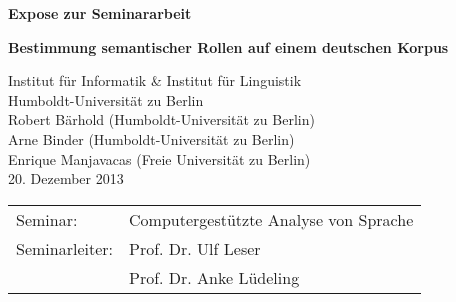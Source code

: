 \documentclass[12pt]{article}
\begin{document}
\thispagestyle{empty} 

\begin{center}
	\vspace*{\fill}
	
	\Huge{\textbf{Expose zur Seminararbeit}}\\
	\vspace{1.5cm}
	
	\Large{\textbf{Bestimmung semantischer Rollen auf einem deutschen Korpus}}\\	
	\vspace{1.5cm}
		

	\begin{Large}
		Institut für Informatik \& Institut für Linguistik\\
		Humboldt-Universität zu Berlin\\
		\vspace{1.5cm}
		Robert Bärhold (Humboldt-Universität zu Berlin)\\
		Arne Binder (Humboldt-Universität zu Berlin)\\
		Enrique Manjavacas (Freie Universität zu Berlin)\\
		20. Dezember 2013 \\
		\vspace{1.5cm}
		
		\begin{table}[h]
			\Large
			\centering
			\begin{tabular}{l l}
				Seminar: & Computergestützte Analyse von Sprache\\
				Seminarleiter: & Prof. Dr. Ulf Leser\\
				 		    & Prof. Dr. Anke Lüdeling
			\end{tabular}
		\end{table}	
	\end{Large}
	\vspace*{\fill}
\end{center}


\pagestyle{fancy} %
\fancyhf{} %
\renewcommand{\headrulewidth}{0pt} %
\renewcommand{\footrulewidth}{0pt} %
\fancyfoot[C]{\thepage} %

\end{document}
